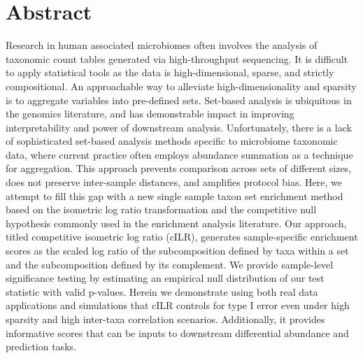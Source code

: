 \documentclass[10pt,letterpaper]{article}
\begin{document}
\section*{Abstract}
Research in human associated microbiomes often involves the analysis of taxonomic count tables generated via high-throughput sequencing. It is difficult to apply statistical tools as the data is high-dimensional, sparse, and strictly compositional. An approachable way to alleviate high-dimensionality and sparsity is to aggregate variables into pre-defined sets. Set-based analysis is ubiquitous in the genomics literature, and has demonstrable impact in improving interpretability and power of downstream analysis. Unfortunately, there is a lack of sophisticated set-based analysis methods specific to microbiome taxonomic data, where current practice often employs abundance summation as a technique for aggregation. This approach prevents comparison across sets of different sizes, does not preserve inter-sample distances, and amplifies protocol bias. Here, we attempt to fill this gap with a new single sample taxon set enrichment method based on the isometric log ratio transformation and the competitive null hypothesis commonly used in the enrichment analysis literature. Our approach, titled competitive isometric log ratio (cILR), generates sample-specific enrichment scores as the scaled log ratio of the subcomposition defined by taxa within a set and the subcomposition defined by its complement. We provide sample-level significance testing by estimating an empirical null distribution of our test statistic with valid p-values. Herein we demonstrate using both real data applications and simulations that cILR controls for type I error even under high sparsity and high inter-taxa correlation scenarios. Additionally, it provides informative scores that can be inputs to downstream differential abundance and prediction tasks. 


\end{document}

